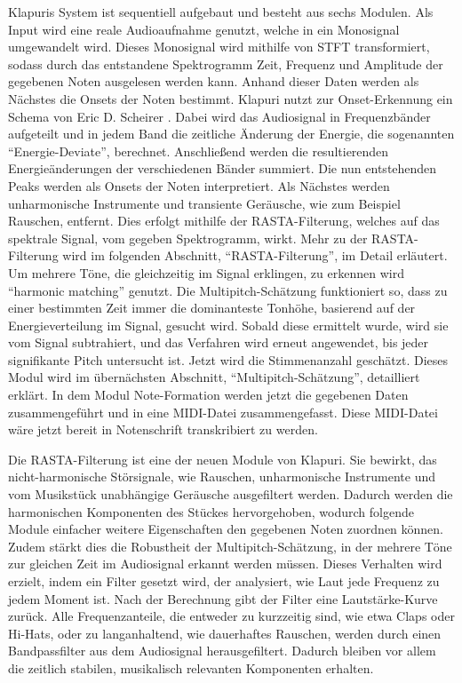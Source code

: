 Klapuris System ist sequentiell aufgebaut und besteht aus sechs Modulen.
Als Input wird eine reale Audioaufnahme genutzt, welche in ein Monosignal umgewandelt wird.
Dieses Monosignal wird mithilfe von STFT transformiert,
sodass durch das entstandene Spektrogramm Zeit,
Frequenz und Amplitude der gegebenen Noten ausgelesen werden kann.
Anhand dieser Daten werden als Nächstes die Onsets der Noten bestimmt.
Klapuri nutzt zur Onset-Erkennung ein Schema von Eric D. Scheirer \cite{scheirer1998tempo}.
Dabei wird das Audiosignal in Frequenzbänder aufgeteilt und in jedem Band die zeitliche Änderung der Energie,
die sogenannten \enquote{Energie-Deviate}, berechnet.
Anschließend werden die resultierenden Energieänderungen der verschiedenen Bänder summiert.
Die nun entstehenden Peaks werden als Onsets der Noten interpretiert.
Als Nächstes werden unharmonische Instrumente und transiente Geräusche, wie zum Beispiel Rauschen, entfernt.
Dies erfolgt mithilfe der RASTA-Filterung, welches auf das spektrale Signal, vom gegeben Spektrogramm, wirkt.
Mehr zu der RASTA-Filterung wird im folgenden Abschnitt, \enquote{RASTA-Filterung}, im Detail erläutert.
Um mehrere Töne, die gleichzeitig im Signal erklingen, zu erkennen wird \enquote{harmonic matching} genutzt.
Die Multipitch-Schätzung funktioniert so, dass zu einer bestimmten Zeit immer die dominanteste Tonhöhe,
basierend auf der Energieverteilung im Signal, gesucht wird.
Sobald diese ermittelt wurde, wird sie vom Signal subtrahiert,
und das Verfahren wird erneut angewendet, bis jeder signifikante Pitch untersucht ist.
Jetzt wird die Stimmenanzahl geschätzt.
Dieses Modul wird im übernächsten Abschnitt, \enquote{Multipitch-Schätzung}, detailliert erklärt.
In dem Modul Note-Formation werden jetzt die gegebenen Daten zusammengeführt und in eine MIDI-Datei zusammengefasst.
Diese MIDI-Datei wäre jetzt bereit in Notenschrift transkribiert zu werden.

\begin{description}[style=nextline]
\item[RASTA-Filterung]\label{itm:rasta}
Die RASTA-Filterung ist eine der neuen Module von Klapuri.
Sie bewirkt, das nicht-harmonische Störsignale, wie
Rauschen, unharmonische Instrumente und vom Musikstück unabhängige Geräusche ausgefiltert werden.
Dadurch werden die harmonischen Komponenten des Stückes hervorgehoben,
wodurch folgende Module einfacher weitere Eigenschaften den gegebenen Noten zuordnen können.
Zudem stärkt dies die Robustheit der Multipitch-Schätzung,
in der mehrere Töne zur gleichen Zeit im Audiosignal erkannt werden müssen.
Dieses Verhalten wird erzielt, indem ein Filter gesetzt wird,
der analysiert, wie Laut jede Frequenz zu jedem Moment ist.
Nach der Berechnung gibt der Filter eine Lautstärke-Kurve zurück.
Alle Frequenzanteile, die entweder zu kurzzeitig sind, wie etwa Claps oder Hi-Hats, oder zu langanhaltend,
wie dauerhaftes Rauschen, werden durch einen Bandpassfilter aus dem Audiosignal herausgefiltert.
Dadurch bleiben vor allem die zeitlich stabilen, musikalisch relevanten Komponenten erhalten.
\end{description}

